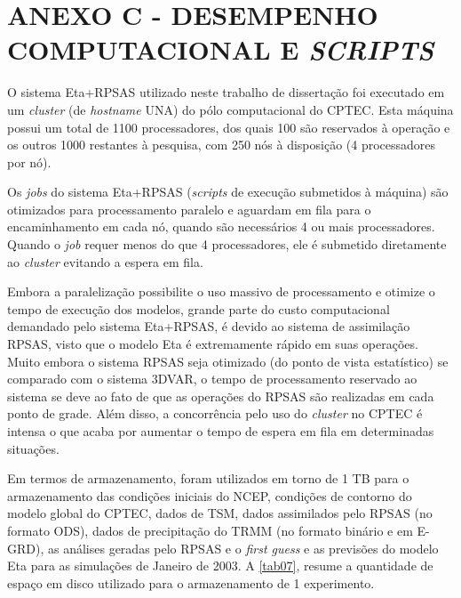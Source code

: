 \hypertarget{estilo:anexo}{}

\chapter{ANEXO C - DESEMPENHO COMPUTACIONAL E \textit{SCRIPTS}}
\label{anexoC}

O sistema Eta+RPSAS utilizado neste trabalho de dissertação foi executado em um \textit{cluster} (de \textit{hostname} UNA) do pólo computacional do CPTEC. Esta máquina possui um total de 1100 processadores, dos quais 100 são reservados à operação e os outros 1000 restantes à pesquisa, com 250 nós à disposição (4 processadores por nó).

Os \textit{jobs} do sistema Eta+RPSAS (\textit{scripts} de execução submetidos à máquina) são otimizados para processamento paralelo e aguardam em fila para o encaminhamento em cada nó, quando são necessários 4 ou mais processadores. Quando o \textit{job} requer menos do que 4 processadores, ele é submetido diretamente ao \textit{cluster} evitando a espera em fila.

Embora a paralelização possibilite o uso massivo de processamento e otimize o tempo de execução dos modelos, grande parte do custo computacional demandado pelo sistema Eta+RPSAS, é devido ao sistema de assimilação RPSAS, visto que o modelo Eta é extremamente rápido em suas operações. Muito embora o sistema RPSAS seja otimizado (do ponto de vista estatístico) se comparado com o sistema 3DVAR, o tempo de processamento reservado ao sistema se deve ao fato de que as operações do RPSAS são realizadas em cada ponto de grade. Além disso, a concorrência pelo uso do \textit{cluster} no CPTEC é intensa o que acaba por aumentar o tempo de espera em fila em determinadas situações.

Em termos de armazenamento, foram utilizados em torno de 1 TB para o armazenamento das condições iniciais do NCEP, condições de contorno do modelo global do CPTEC, dados de TSM, dados assimilados pelo RPSAS (no formato ODS), dados de precipitação do TRMM (no formato binário e em E-GRD), as análises geradas pelo RPSAS e o \textit{first guess} e as previsões do modelo Eta para as simulações de Janeiro de 2003. A \autoref{tab07}, resume a quantidade de espaço em disco utilizado para o armazenamento de 1 experimento.

\break

